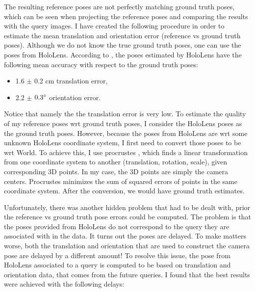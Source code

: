 \documentclass[twoside]{ctuthesis}
\theoremstyle{plain}
\theoremstyle{definition}
\theoremstyle{note}
\begin{document}
\label{paragraph:gt-vs-ref-poses}
The resulting reference poses are not perfectly matching ground truth poses, which can be seen when projecting the reference poses and comparing the results with the query images. I have created the following procedure in order to estimate the mean translation and orientation error (reference vs ground truth poses). Although we do not know the true ground truth poses, one can use the poses from HoloLens. According to \cite{HoloLensEvaluation}, the poses estimated by HoloLens have the following mean accuracy with respect to the ground truth poses:

\begin{itemize}
	\item 1.6 $\pm$ 0.2 cm translation error,
	\item 2.2 $\pm$ $0.3\degree$ orientation error.
\end{itemize}

Notice that namely the the translation error is very low. To estimate the quality of my reference poses wrt ground truth poses, I consider the HoloLens poses as the ground truth poses. However, because the poses from HoloLens are wrt some unknown HoloLens coordinate system, I first need to convert those poses to be wrt World. To achieve this, I use procrustes \cite{procrustes}, which finds a linear transformation from one coordinate system to another (translation, rotation, scale), given corresponding 3D points. In my case, the 3D points are simply the camera centers. Procrustes minimizes the sum of squared errors of points in the same coordinate system. After the conversion, we would have ground truth estimates.

Unfortunately, there was another hidden problem that had to be dealt with, prior the reference vs ground truth pose errors could be computed. The problem is that the poses provided from HoloLens do not correspond to the query they are associated with in the data. It turns out the poses are delayed. To make matters worse, both the translation and orientation that are used to construct the camera pose are delayed by a different amount! To resolve this issue, the pose from HoloLens associated to a query is computed to be based on translation and orientation data, that comes from the future queries. I found that the best results were achieved with the following delays:
\end{document}
